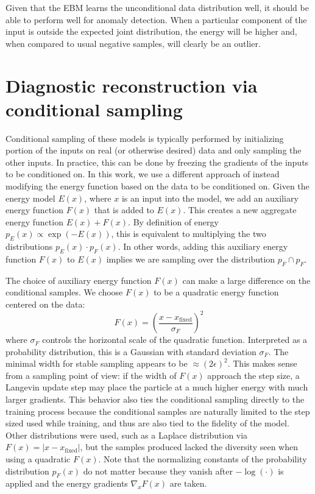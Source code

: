 Given that the EBM learns the unconditional data distribution well, it should be able to perform well for anomaly detection. When a particular component of the input is outside the expected joint distribution, the energy will be higher and, when compared to usual negative samples, will clearly be an outlier.

\section{Diagnostic reconstruction via conditional sampling}

Conditional sampling of these models is typically performed by initializing portion of the inputs on real (or otherwise desired) data and only sampling the other inputs. In practice, this can be done by freezing the gradients of the inputs to be conditioned on. In this work, we use a different approach of instead modifying the energy function based on the data to be conditioned on. Given the energy model $E(x)$, where $x$ is an input into the model, we add an auxiliary energy function $F(x)$ that is added to $E(x)$. This creates a new aggregate energy function $E(x) + F(x)$. By definition of energy $p_E(x) \propto \exp(-E(x))$, this is equivalent to multiplying the two distributions $p_E(x) \cdot p_F(x)$. In other words, adding this auxiliary energy function $F(x)$ to $E(x)$ implies we are sampling over the distribution $p_F \cap p_F$.

The choice of auxiliary energy function $F(x)$ can make a large difference on the conditional samples. We choose $F(x)$ to be a quadratic energy function centered on the data: 
\begin{equation}
	F(x) = \left(\frac{x - x_\text{fixed}}{\sigma_F} \right)^2
\end{equation}
where $\sigma_F$ controls the horizontal scale of the quadratic function. Interpreted as a probability distribution, this is a Gaussian with standard deviation $\sigma_F$. The minimal width for stable sampling appears to be $\approx (2 \epsilon)^2$. This makes sense from a sampling point of view: if the width of $F(x)$ approach the step size, a Langevin update step may place the particle at a much higher energy with much larger gradients. This behavior also ties the conditional sampling directly to the training process because the conditional samples are naturally limited to the step sized used while training, and thus are also tied to the fidelity of the model. Other distributions were used, such as a Laplace distribution via $F(x) = \vert x - x_\text{fixed} \vert$, but the samples produced lacked the diversity seen when using a quadratic $F(x)$. Note that the normalizing constants of the probability distribution $p_F(x)$ do not matter because they vanish after $-\log(\cdot)$ is applied and the energy gradients $\nabla_x F(x)$ are taken.

